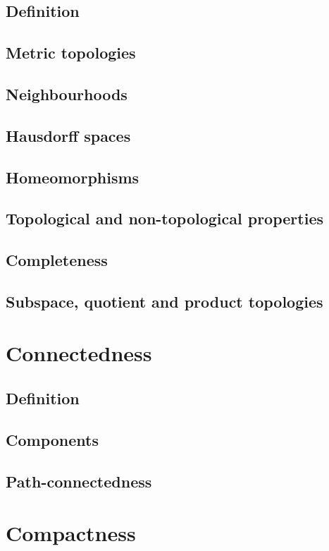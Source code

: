 \documentclass[main.tex]{subfiles}
\begin{document}
			\subsection{Definition}
			
			\subsection{Metric topologies}
			
			\subsection{Neighbourhoods}
			
			\subsection{Hausdorff spaces}
			
			\subsection{Homeomorphisms}
			
			\subsection{Topological and non-topological properties}
			
			\subsection{Completeness}
			
			\subsection{Subspace, quotient and product topologies}
			
		\section{Connectedness}
			\subsection{Definition}
			
			\subsection{Components}
			
			\subsection{Path-connectedness}
			
			
		\section{Compactness}
\end{document}
